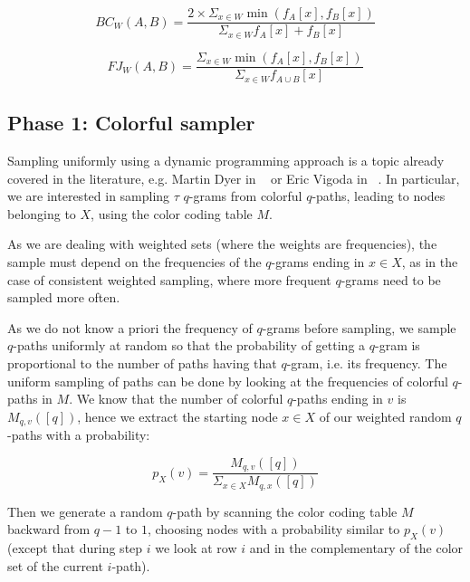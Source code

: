 \begin{equation}\label{bc-w}
	BC_{W}(A,B) = \frac{ 2 \times \Sigma_{x \in W} \min(f_{A}[x], f_{B}[x]) }{ \Sigma_{x \in W} f_{A}[x] + f_{B}[x] }
\end{equation}

\begin{equation}\label{fj-w}
	FJ_{W}(A,B) = \frac{ \Sigma_{x \in W} \min(f_{A}[x], f_{B}[x]) }{ \Sigma_{x \in W} f_{A \cup B}[x] }
\end{equation}

\subsection*{Phase 1: Colorful sampler}

Sampling uniformly using a dynamic programming approach is a topic already covered in the literature, e.g. Martin Dyer in ~\cite{Dyer:2003:ACD:780542.780643} or Eric Vigoda in ~\cite{Vigoda2010LectureNO}. In particular, we are interested in sampling $\tau$ $q$-grams from colorful $q$-paths, leading to nodes belonging to $X$, using the color coding table $M$.\bigskip

As we are dealing with weighted sets (where the weights are frequencies), the sample must depend on the frequencies of the $q$-grams ending in $x \in X$, as in the case of consistent weighted sampling, where more frequent $q$-grams need to be sampled more often.
 
As we do not know a priori the frequency of $q$-grams before sampling, we sample $q$-paths uniformly at random so that the probability of getting a $q$-gram is proportional to the number of paths having that $q$-gram, i.e. its frequency. The uniform sampling of paths can be done by looking at the frequencies of colorful $q$-paths in $M$. We know that the number of colorful $q$-paths ending in $v$ is $M_{q,v}([q])$, hence we extract the starting node $x \in X$ of our weighted random $q$-paths with a probability:\bigskip

\begin{equation}
	p_{X}(v) = \frac{ M_{q,v}([q]) }{ \Sigma_{x \in X}{M_{q, x}([q])} }
\end{equation}

\bigskip

Then we generate a random $q$-path by scanning the color coding table $M$ backward from $q-1$ to $1$, choosing nodes with a probability similar to $p_{X}(v)$ (except that during step $i$ we look at row $i$ and in the complementary of the color set of the current $i$-path).\bigskip


